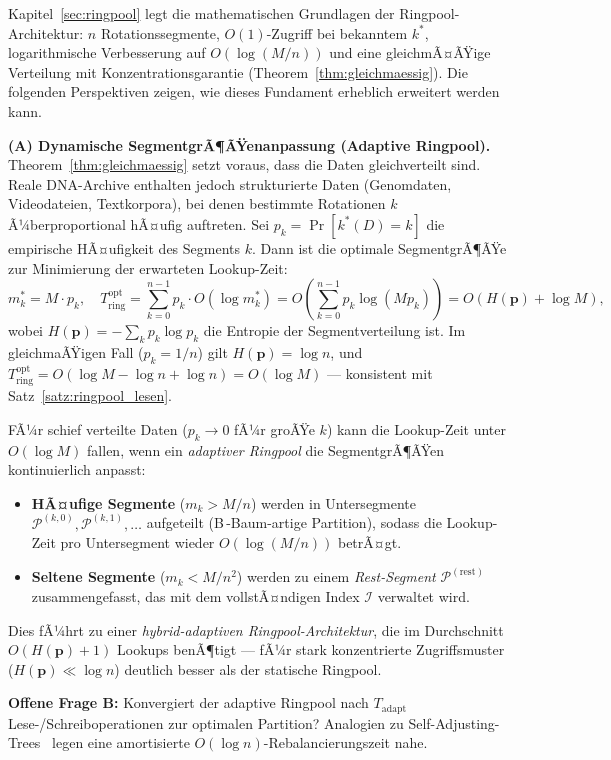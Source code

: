 ﻿\documentclass[a4paper,12pt]{article}
\theoremstyle{definition}
\theoremstyle{plain}
\begin{document}
Kapitel~\ref{sec:ringpool} legt die mathematischen Grundlagen der
Ringpool-Architektur: $n$ Rotationssegmente, $O(1)$-Zugriff bei
bekanntem $k^*$, logarithmische Verbesserung auf $O(\log(M/n))$ und
eine gleichmÃ¤ÃŸige Verteilung mit Konzentrations\-garantie
(Theorem~\ref{thm:gleichmaessig}).  Die folgenden Perspektiven zeigen,
wie dieses Fundament erheblich erweitert werden kann.

\textbf{(A) Dynamische SegmentgrÃ¶ÃŸenanpassung (Adaptive Ringpool).}
Theorem~\ref{thm:gleichmaessig} setzt voraus, dass die Daten
gleichverteilt sind.  Reale DNA-Archive enthalten jedoch strukturierte
Daten (Genomdaten, Videodateien, Textkorpora), bei denen bestimmte
Rotationen $k$ Ã¼berproportional hÃ¤ufig auftreten.  Sei
$p_k = \Pr[k^*(D) = k]$ die empirische HÃ¤ufigkeit des Segments $k$.
Dann ist die optimale SegmentgrÃ¶ÃŸe zur Minimierung der erwarteten
Lookup-Zeit:
\[
  m_k^* = M \cdot p_k,
  \quad
  T_{\mathrm{ring}}^{\mathrm{opt}}
  = \sum_{k=0}^{n-1} p_k \cdot O(\log m_k^*)
  = O\!\left(\sum_{k=0}^{n-1} p_k \log(M p_k)\right)
  = O(H(\mathbf{p}) + \log M),
\]
wobei $H(\mathbf{p}) = -\sum_k p_k \log p_k$ die Entropie der
Segmentverteilung ist.  Im gleichma\-ÃŸigen Fall ($p_k = 1/n$) gilt
$H(\mathbf{p}) = \log n$, und $T_{\mathrm{ring}}^{\mathrm{opt}}
= O(\log M - \log n + \log n) = O(\log M)$ --- konsistent mit
Satz~\ref{satz:ringpool_lesen}.

FÃ¼r schief verteilte Daten ($p_k \to 0$ fÃ¼r groÃŸe $k$) kann die
Lookup-Zeit unter $O(\log M)$ fallen, wenn ein \emph{adaptiver Ringpool}
die SegmentgrÃ¶ÃŸen kontinuierlich anpasst:
\begin{itemize}
  \item \textbf{HÃ¤ufige Segmente} ($m_k > M/n$) werden in Untersegmente
        $\mathcal{P}^{(k,0)}, \mathcal{P}^{(k,1)}, \ldots$ aufgeteilt
        (B\,-Baum-artige Partition), sodass die Lookup-Zeit pro
        Untersegment wieder $O(\log(M/n))$ betrÃ¤gt.
  \item \textbf{Seltene Segmente} ($m_k < M/n^2$) werden zu einem
        \emph{Rest-Segment} $\mathcal{P}^{(\text{rest})}$ zusammengefasst,
        das mit dem vollstÃ¤ndigen Index $\mathcal{I}$ verwaltet wird.
\end{itemize}
Dies fÃ¼hrt zu einer \emph{hybrid-adaptiven Ringpool-Architektur}, die
im Durchschnitt $O(H(\mathbf{p}) + 1)$ Lookups benÃ¶tigt --- fÃ¼r stark
konzentrierte Zugriffsmuster ($H(\mathbf{p}) \ll \log n$) deutlich
besser als der statische Ringpool.

\textbf{Offene Frage B:} Konvergiert der adaptive Ringpool nach
$T_{\mathrm{adapt}}$ Lese-/Schreiboperatio\-nen zur optimalen Partition?
Analogien zu Self-Adjusting-Trees~\cite{sleator1985} legen eine
amortisierte $O(\log n)$-Rebalancierungszeit nahe.
\end{document}
